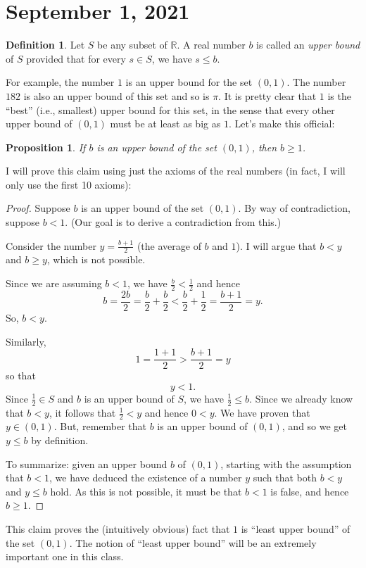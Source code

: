 \documentclass[12pt]{amsart}
\newcommand{\R}{{\mathbb{R}}}
\numberwithin{equation}{section}
\theoremstyle{plain} %
\newtheorem{prop}[equation]{Proposition}
\newcommand{\Sept}[1]{\section{September #1, 2021}}
\theoremstyle{definition}
\newtheorem{defn}[equation]{Definition}
\theoremstyle{remark}
\begin{document}
\Sept{1}

\begin{defn} Let $S$ be any subset of $\R$. A real number $b$ is called an  {\em upper bound} of $S$ provided that for every $s \in S$,
we have $s \leq b$. 
\end{defn}


For example, the number $1$ is an upper bound for the set $(0,1)$. The number $182$ is also an upper bound of this set and so is $\pi$. It is pretty clear
that $1$ is the ``best'' (i.e., smallest) upper bound for this set, in the sense that every other upper bound of $(0,1)$ must be at least as
big as $1$. Let's make this official:

\begin{prop}  If $b$ is an upper bound of the set $(0,1)$, then $b \geq 1$.
\end{prop}

I will prove this claim using just the axioms of the real numbers (in fact, I will only use the first 10 axioms):

\begin{proof} Suppose $b$ is an upper bound of the set $(0,1)$. By way of contradiction, suppose $b < 1$. (Our goal is
  to derive a contradiction from this.)


 Consider the number $y = \frac{b+1}{2}$ (the
  average of $b$ and $1$). I will argue that $b < y$ and $b \geq y$, which is not possible.

Since we are assuming $b < 1$, we have $\frac{b}{2} < \frac12$ and hence
$$
b = \frac{2b}{2} = \frac{b}{2}+ \frac{b}{2} < \frac{b}{2} + \frac{1}{2} = \frac{b+1}{2} = y.
$$
So,  $b < y$. 

Similarly, 
$$
1 = \frac{1 + 1}{2} > \frac{b+1}{2} = y
$$
so that
$$
y < 1.
$$
Since $\frac12 \in S$ and $b$ is an upper bound of $S$, we have $\frac12 \leq b$. Since we already know that $b < y$, it follows that
$\frac12 < y$
and hence $0 < y$. We have proven that $y \in (0,1)$. But, 
remember that $b$ is an upper bound of $(0,1)$, and so we get $y \leq b$ by definition.

To summarize: given an upper bound $b$ of $(0,1)$, starting with the assumption that $b < 1$,
we have deduced the existence of a number $y$ such that  both $b < y$ and $y \leq b$ hold.
As this is not possible, it must be that $b < 1$ is false, and hence $b \geq 1$. 
\end{proof}

This claim proves the (intuitively obvious) fact that $1$ is ``least upper bound'' of the set $(0,1)$. The notion of ``least upper bound''
will be an extremely important one in this class.
\end{document}
